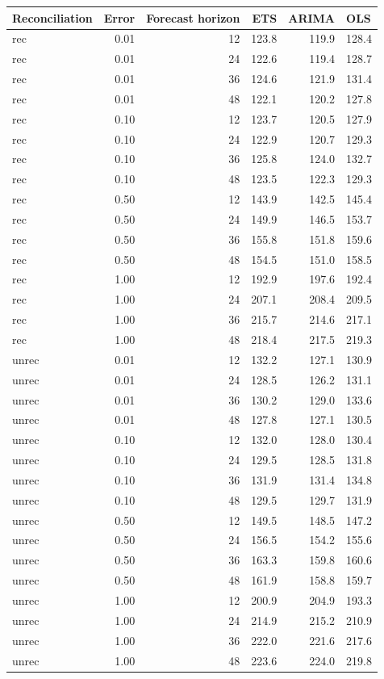 \documentclass[11pt,a4paper,]{article}
\let\origtable\table
\let\endorigtable\endtable
\renewenvironment{table}[1][2] {
    \expandafter\origtable\expandafter[!htbp]
} {
    \endorigtable
}
\begin{document}
\begin{table}[!h]

\caption{\label{tab:TourismdatasimrollingnoiseFH}Mean RMSE on one to four year test set with different error levels for ETS, ARIMA and OLS with and without reconciliation - Rolling origin - 304 bottom level series and 8 levels of hierarchy - Simulated tourism dataset}
\centering
\begin{tabular}[t]{lrrrrl}
\toprule
Reconciliation & Error & Forecast horizon & ETS & ARIMA & OLS\\
\midrule
rec & 0.01 & 12 & 123.8 & 119.9 & 128.4\\
rec & 0.01 & 24 & 122.6 & 119.4 & 128.7\\
rec & 0.01 & 36 & 124.6 & 121.9 & 131.4\\
rec & 0.01 & 48 & 122.1 & 120.2 & 127.8\\
rec & 0.10 & 12 & 123.7 & 120.5 & 127.9\\
rec & 0.10 & 24 & 122.9 & 120.7 & 129.3\\
rec & 0.10 & 36 & 125.8 & 124.0 & 132.7\\
rec & 0.10 & 48 & 123.5 & 122.3 & 129.3\\
rec & 0.50 & 12 & 143.9 & 142.5 & 145.4\\
rec & 0.50 & 24 & 149.9 & 146.5 & 153.7\\
rec & 0.50 & 36 & 155.8 & 151.8 & 159.6\\
rec & 0.50 & 48 & 154.5 & 151.0 & 158.5\\
rec & 1.00 & 12 & 192.9 & 197.6 & 192.4\\
rec & 1.00 & 24 & 207.1 & 208.4 & 209.5\\
rec & 1.00 & 36 & 215.7 & 214.6 & 217.1\\
rec & 1.00 & 48 & 218.4 & 217.5 & 219.3\\
unrec & 0.01 & 12 & 132.2 & 127.1 & 130.9\\
unrec & 0.01 & 24 & 128.5 & 126.2 & 131.1\\
unrec & 0.01 & 36 & 130.2 & 129.0 & 133.6\\
unrec & 0.01 & 48 & 127.8 & 127.1 & 130.5\\
unrec & 0.10 & 12 & 132.0 & 128.0 & 130.4\\
unrec & 0.10 & 24 & 129.5 & 128.5 & 131.8\\
unrec & 0.10 & 36 & 131.9 & 131.4 & 134.8\\
unrec & 0.10 & 48 & 129.5 & 129.7 & 131.9\\
unrec & 0.50 & 12 & 149.5 & 148.5 & 147.2\\
unrec & 0.50 & 24 & 156.5 & 154.2 & 155.6\\
unrec & 0.50 & 36 & 163.3 & 159.8 & 160.6\\
unrec & 0.50 & 48 & 161.9 & 158.8 & 159.7\\
unrec & 1.00 & 12 & 200.9 & 204.9 & 193.3\\
unrec & 1.00 & 24 & 214.9 & 215.2 & 210.9\\
unrec & 1.00 & 36 & 222.0 & 221.6 & 217.6\\
unrec & 1.00 & 48 & 223.6 & 224.0 & 219.8\\
\bottomrule
\end{tabular}
\end{table}
\end{document}
